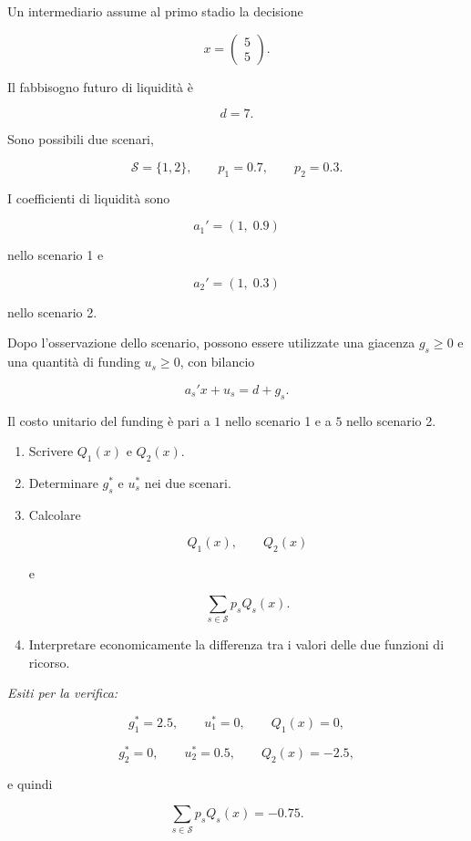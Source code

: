 \begin{exercise}

\label{ex:cap14-proposto-ricorso}

Un intermediario assume al primo stadio la decisione

\[
x=
\begin{pmatrix}
5\\
5
\end{pmatrix}.
\]

Il fabbisogno futuro di liquidit\`a \`e

\[
d=7.
\]

Sono possibili due scenari,

\[
\mathcal S=\{1,2\},
\qquad
p_1=0.7,
\qquad
p_2=0.3.
\]

I coefficienti di liquidit\`a sono

\[
a_1'
=
(1,\;0.9)
\]

\noindent nello scenario 1 e

\[
a_2'
=
(1,\;0.3)
\]

\noindent nello scenario 2.

Dopo l'osservazione dello scenario, possono essere utilizzate una giacenza
$g_s\geq0$ e una quantit\`a di funding $u_s\geq0$, con bilancio

\[
a_s'x+u_s
=
d+g_s.
\]

Il costo unitario del funding \`e pari a $1$ nello scenario 1 e a $5$ nello
scenario 2.

\begin{enumerate}

\item Scrivere $Q_1(x)$ e $Q_2(x)$.

\item Determinare $g_s^*$ e $u_s^*$ nei due scenari.

\item Calcolare

\[
Q_1(x),
\qquad
Q_2(x)
\]

\noindent e

\[
\sum_{s\in\mathcal S}p_sQ_s(x).
\]

\item Interpretare economicamente la differenza tra i valori delle due
funzioni di ricorso.

\end{enumerate}

\medskip

\noindent
\textit{Esiti per la verifica:}

\[
g_1^*=2.5,
\qquad
u_1^*=0,
\qquad
Q_1(x)=0,
\]

\[
g_2^*=0,
\qquad
u_2^*=0.5,
\qquad
Q_2(x)=-2.5,
\]

\noindent e quindi

\[
\sum_{s\in\mathcal S}p_sQ_s(x)
=
-0.75.
\]

\end{exercise}


